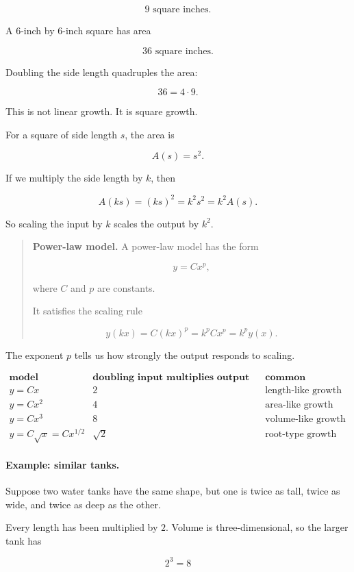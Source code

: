 \[
9\text{ square inches}.
\]

A \(6\)-inch by \(6\)-inch square has area

\[
36\text{ square inches}.
\]

Doubling the side length quadruples the area:

\[
36=4\cdot 9.
\]

This is not linear growth. It is square growth.

For a square of side length \(s\), the area is

\[
A(s)=s^2.
\]

If we multiply the side length by \(k\), then

\[
A(ks)=(ks)^2=k^2s^2=k^2A(s).
\]

So scaling the input by \(k\) scales the output by \(k^2\).

\begin{quote}
\textbf{Power-law model.}
A power-law model has the form

\[
y=Cx^p,
\]

where \(C\) and \(p\) are constants.

It satisfies the scaling rule

\[
y(kx)=C(kx)^p=k^pCx^p=k^p y(x).
\]
\end{quote}

The exponent \(p\) tells us how strongly the output responds to scaling.

\[
\begin{array}{c|c|c}
\textbf{model} & \textbf{doubling input multiplies output by} & \textbf{common meaning} \\ \hline
y=Cx & 2 & \text{length-like growth} \\
y=Cx^2 & 4 & \text{area-like growth} \\
y=Cx^3 & 8 & \text{volume-like growth} \\
y=C\sqrt{x}=Cx^{1/2} & \sqrt2 & \text{root-type growth}
\end{array}
\]

\paragraph{Example: similar tanks.}
Suppose two water tanks have the same shape, but one is twice as tall, twice as wide, and twice as deep as the other.

Every length has been multiplied by \(2\). Volume is three-dimensional, so the larger tank has

\[
2^3=8
\]

